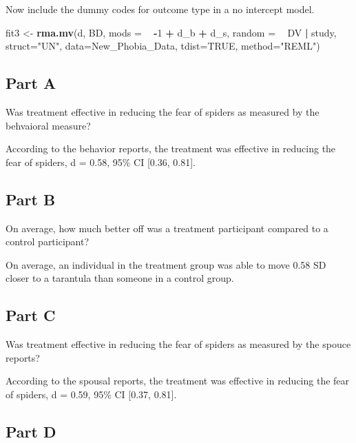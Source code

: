 \documentclass[]{article}
\newenvironment{Shaded}{\begin{snugshade}}{\end{snugshade}}
\newcommand{\KeywordTok}[1]{\textcolor[rgb]{0.13,0.29,0.53}{\textbf{#1}}}
\newcommand{\DataTypeTok}[1]{\textcolor[rgb]{0.13,0.29,0.53}{#1}}
\newcommand{\DecValTok}[1]{\textcolor[rgb]{0.00,0.00,0.81}{#1}}
\newcommand{\StringTok}[1]{\textcolor[rgb]{0.31,0.60,0.02}{#1}}
\newcommand{\OtherTok}[1]{\textcolor[rgb]{0.56,0.35,0.01}{#1}}
\newcommand{\OperatorTok}[1]{\textcolor[rgb]{0.81,0.36,0.00}{\textbf{#1}}}
\newcommand{\NormalTok}[1]{#1}
\begin{document}
Now include the dummy codes for outcome type in a no intercept model.

\begin{Shaded}
\begin{Highlighting}[]
\NormalTok{fit3 <-}\StringTok{ }\KeywordTok{rma.mv}\NormalTok{(d, BD, }\DataTypeTok{mods =} \OperatorTok{~}\StringTok{ }\OperatorTok{-}\DecValTok{1} \OperatorTok{+}\StringTok{ }\NormalTok{d_b }\OperatorTok{+}\StringTok{ }\NormalTok{d_s, }\DataTypeTok{random =} \OperatorTok{~}\StringTok{ }\NormalTok{DV }\OperatorTok{|}\StringTok{ }\NormalTok{study, }\DataTypeTok{struct=}\StringTok{"UN"}\NormalTok{, }\DataTypeTok{data=}\NormalTok{New_Phobia_Data, }\DataTypeTok{tdist=}\OtherTok{TRUE}\NormalTok{, }\DataTypeTok{method=}\StringTok{"REML"}\NormalTok{)}
\end{Highlighting}
\end{Shaded}

\subsection{Part A}\label{part-a-2}

Was treatment effective in reducing the fear of spiders as measured by
the behvaioral measure?

According to the behavior reports, the treatment was effective in
reducing the fear of spiders, d = 0.58, 95\% CI {[}0.36, 0.81{]}.

\subsection{Part B}\label{part-b-2}

On average, how much better off was a treatment participant compared to
a control participant?

On average, an individual in the treatment group was able to move 0.58
SD closer to a tarantula than someone in a control group.

\subsection{Part C}\label{part-c-1}

Was treatment effective in reducing the fear of spiders as measured by
the spouce reports?

According to the spousal reports, the treatment was effective in
reducing the fear of spiders, d = 0.59, 95\% CI {[}0.37, 0.81{]}.

\subsection{Part D}\label{part-d-1}
\end{document}
